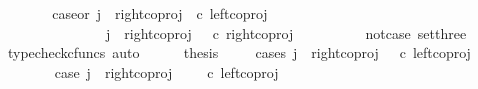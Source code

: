 \begin{isabellebody}
\ \ \ \ \isamarkupfalse%
\ \isamarkupfalse%
\ case{}{\isacharunderscore}{\kern0pt}or{\isacharunderscore}{\kern0pt}{}{\isacharcolon}{\kern0pt}\ {\isachardoublequoteopen}j\ {\isacharequal}{\kern0pt}\ right{\isacharunderscore}{\kern0pt}coproj\ {\isasymone}\ {\isacharparenleft}{\kern0pt}{\isasymone}{\isasymCoprod}{\isasymone}{\isacharparenright}{\kern0pt}{\isasymcirc}\isactrlsub c\ left{\isacharunderscore}{\kern0pt}coproj\ {\isasymone}\ {\isasymone}\ {\isasymor}\ \isanewline
\ \ \ \ \ \ \ \ \ \ \ \ \ \ \ j\ {\isacharequal}{\kern0pt}\ right{\isacharunderscore}{\kern0pt}coproj\ {\isasymone}\ {\isacharparenleft}{\kern0pt}{\isasymone}{\isasymCoprod}{\isasymone}{\isacharparenright}{\kern0pt}\ {\isasymcirc}\isactrlsub c\ right{\isacharunderscore}{\kern0pt}coproj\ {\isasymone}\ {\isasymone}{\isachardoublequoteclose}\isanewline
\ \ \ \ \ \ \isamarkupfalse%
\ not{\isacharunderscore}{\kern0pt}case{}\ set{\isacharunderscore}{\kern0pt}three\ \isamarkupfalse%
\ {\isacharparenleft}{\kern0pt}typecheck{\isacharunderscore}{\kern0pt}cfuncs{\isacharcomma}{\kern0pt}\ auto{\isacharparenright}{\kern0pt}\isanewline
\ \ \ \ \isamarkupfalse%
\ {\isacharquery}{\kern0pt}thesis\isanewline
\ \ \ \ \isamarkupfalse%
{\isacharparenleft}{\kern0pt}cases\ {\isachardoublequoteopen}j\ {\isacharequal}{\kern0pt}\ right{\isacharunderscore}{\kern0pt}coproj\ {\isasymone}\ {\isacharparenleft}{\kern0pt}{\isasymone}{\isasymCoprod}{\isasymone}{\isacharparenright}{\kern0pt}\ {\isasymcirc}\isactrlsub c\ left{\isacharunderscore}{\kern0pt}coproj\ {\isasymone}\ {\isasymone}{\isachardoublequoteclose}{\isacharparenright}{\kern0pt}\isanewline
\ \ \ \ \ \ \isamarkupfalse%
\ case{}{\isacharcolon}{\kern0pt}\ {\isachardoublequoteopen}j\ {\isacharequal}{\kern0pt}\ right{\isacharunderscore}{\kern0pt}coproj\ {\isasymone}\ {\isacharparenleft}{\kern0pt}{\isasymone}\ {\isasymCoprod}\ {\isasymone}{\isacharparenright}{\kern0pt}\ {\isasymcirc}\isactrlsub c\ left{\isacharunderscore}{\kern0pt}coproj\ {\isasymone}\ {\isasymone}{\isachardoublequoteclose}\isanewline
\ \ \ \ \ \ \isamarkupfalse%
\ {\isachardoublequoteopen}{\isasymlangle}{\isasymt}{\isacharcomma}{\kern0pt}\ {\isasymf}{\isasymrangle}\ {\isacharequal}{\kern0pt}\ {\isasymlangle}{\isasymt}{\isacharcomma}{\kern0pt}{\isasymt}{\isasymrangle}{\isachardoublequoteclose}\isanewline
\ \ \ \ \ \ \isamarkupfalse%
\ {\isacharminus}{\kern0pt}\ \isanewline
\ \ \ \ \ \ \ \ \isamarkupfalse%

\end{isabellebody}
